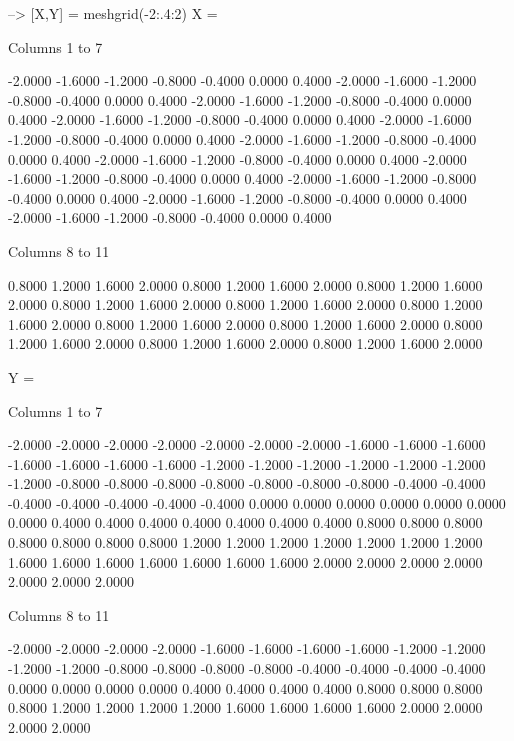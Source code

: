 \begin{DoxyVerbInclude}
--> [X,Y] = meshgrid(-2:.4:2)
X = 

 Columns 1 to 7

   -2.0000   -1.6000   -1.2000   -0.8000   -0.4000    0.0000    0.4000 
   -2.0000   -1.6000   -1.2000   -0.8000   -0.4000    0.0000    0.4000 
   -2.0000   -1.6000   -1.2000   -0.8000   -0.4000    0.0000    0.4000 
   -2.0000   -1.6000   -1.2000   -0.8000   -0.4000    0.0000    0.4000 
   -2.0000   -1.6000   -1.2000   -0.8000   -0.4000    0.0000    0.4000 
   -2.0000   -1.6000   -1.2000   -0.8000   -0.4000    0.0000    0.4000 
   -2.0000   -1.6000   -1.2000   -0.8000   -0.4000    0.0000    0.4000 
   -2.0000   -1.6000   -1.2000   -0.8000   -0.4000    0.0000    0.4000 
   -2.0000   -1.6000   -1.2000   -0.8000   -0.4000    0.0000    0.4000 
   -2.0000   -1.6000   -1.2000   -0.8000   -0.4000    0.0000    0.4000 
   -2.0000   -1.6000   -1.2000   -0.8000   -0.4000    0.0000    0.4000 

 Columns 8 to 11

    0.8000    1.2000    1.6000    2.0000 
    0.8000    1.2000    1.6000    2.0000 
    0.8000    1.2000    1.6000    2.0000 
    0.8000    1.2000    1.6000    2.0000 
    0.8000    1.2000    1.6000    2.0000 
    0.8000    1.2000    1.6000    2.0000 
    0.8000    1.2000    1.6000    2.0000 
    0.8000    1.2000    1.6000    2.0000 
    0.8000    1.2000    1.6000    2.0000 
    0.8000    1.2000    1.6000    2.0000 
    0.8000    1.2000    1.6000    2.0000 

Y = 

 Columns 1 to 7

   -2.0000   -2.0000   -2.0000   -2.0000   -2.0000   -2.0000   -2.0000 
   -1.6000   -1.6000   -1.6000   -1.6000   -1.6000   -1.6000   -1.6000 
   -1.2000   -1.2000   -1.2000   -1.2000   -1.2000   -1.2000   -1.2000 
   -0.8000   -0.8000   -0.8000   -0.8000   -0.8000   -0.8000   -0.8000 
   -0.4000   -0.4000   -0.4000   -0.4000   -0.4000   -0.4000   -0.4000 
    0.0000    0.0000    0.0000    0.0000    0.0000    0.0000    0.0000 
    0.4000    0.4000    0.4000    0.4000    0.4000    0.4000    0.4000 
    0.8000    0.8000    0.8000    0.8000    0.8000    0.8000    0.8000 
    1.2000    1.2000    1.2000    1.2000    1.2000    1.2000    1.2000 
    1.6000    1.6000    1.6000    1.6000    1.6000    1.6000    1.6000 
    2.0000    2.0000    2.0000    2.0000    2.0000    2.0000    2.0000 

 Columns 8 to 11

   -2.0000   -2.0000   -2.0000   -2.0000 
   -1.6000   -1.6000   -1.6000   -1.6000 
   -1.2000   -1.2000   -1.2000   -1.2000 
   -0.8000   -0.8000   -0.8000   -0.8000 
   -0.4000   -0.4000   -0.4000   -0.4000 
    0.0000    0.0000    0.0000    0.0000 
    0.4000    0.4000    0.4000    0.4000 
    0.8000    0.8000    0.8000    0.8000 
    1.2000    1.2000    1.2000    1.2000 
    1.6000    1.6000    1.6000    1.6000 
    2.0000    2.0000    2.0000    2.0000 
\end{DoxyVerbInclude}


